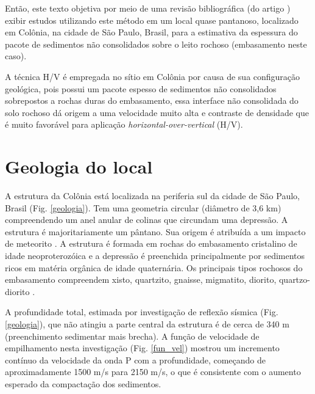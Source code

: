 \documentclass[smallextended]{svjour3}       %
\begin{document}
Então, este texto objetiva por meio de uma revisão bibliográfica (do artigo \citealp{ullah2016thickness}) exibir estudos utilizando este método em um local quase pantanoso, localizado em Colônia, na cidade de São Paulo, Brasil, para a estimativa da espessura do pacote de sedimentos não consolidados sobre o leito rochoso (embasamento neste caso). 

A técnica H/V é empregada no sítio em Colônia por causa de sua configuração geológica, pois possui um pacote espesso de sedimentos não consolidados sobrepostos a rochas duras do embasamento, essa interface não consolidada do solo rochoso dá origem a uma velocidade muito alta e contraste de densidade que é muito favorável para aplicação \textit{horizontal-over-vertical} (H/V).


\section{Geologia do local}

A estrutura da Colônia está localizada na periferia sul da cidade de São Paulo, Brasil (Fig. \ref{geologia}). Tem uma geometria circular (diâmetro de 3,6 km) compreendendo um anel anular de colinas que circundam uma depressão. A estrutura é majoritariamente um pântano. Sua origem é atribuída a um impacto de meteorito \citep{riccomini1989colonia}. A estrutura é formada em rochas do embasamento cristalino de idade neoproterozóica e a depressão é preenchida principalmente por sedimentos ricos em matéria orgânica de idade quaternária. Os principais tipos rochosos do embasamento compreendem xisto, quartzito, gnaisse, migmatito, diorito, quartzo-diorito \citep{sadowski1974tectonica}.

A profundidade total, estimada por investigação de reflexão sísmica (Fig. \ref{geologia}), que não atingiu a parte central da estrutura \citep{riccomini2011colonia} é de cerca de 340 m (preenchimento sedimentar mais brecha). A função de velocidade de empilhamento nesta investigação (Fig. \ref{fun_vel}) mostrou um incremento contínuo da velocidade da onda P com a profundidade, começando de aproximadamente 1500 m/s para 2150 m/s, o que é consistente com o aumento esperado da compactação dos sedimentos.
\end{document}
